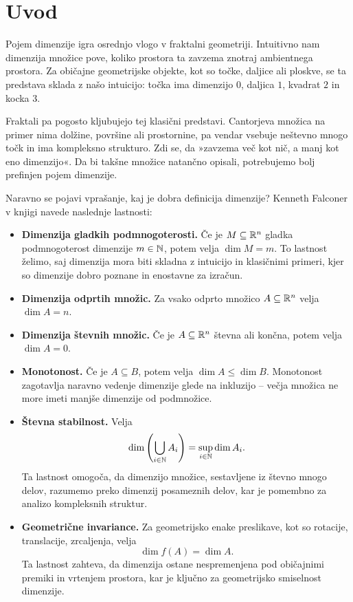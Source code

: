 \section{Uvod}
Pojem dimenzije igra osrednjo vlogo v fraktalni geometriji. Intuitivno nam dimenzija množice pove, koliko prostora ta zavzema znotraj ambientnega prostora. Za običajne geometrijske objekte, kot so točke, daljice ali ploskve, se ta predstava sklada z našo intuicijo: točka ima dimenzijo \(0\), daljica \(1\), kvadrat \(2\) in kocka \(3\).

Fraktali pa pogosto kljubujejo tej klasični predstavi. Cantorjeva množica na primer nima dolžine, površine ali prostornine, pa vendar vsebuje neštevno mnogo točk in ima kompleksno strukturo. Zdi se, da »zavzema več kot nič, a manj kot eno dimenzijo«. Da bi takšne množice natančno opisali, potrebujemo bolj prefinjen pojem dimenzije.

Naravno se pojavi vprašanje, kaj je dobra definicija dimenzije? Kenneth Falconer v knjigi \cite{fk-fg} navede naslednje lastnosti:

\begin{itemize}
    \item \textbf{Dimenzija gladkih podmnogoterosti.} Če je \(M \subseteq \mathbb{R}^n\) gladka podmnogoterost dimenzije \(m \in \mathbb{N}\), potem velja \(\dim M = m\).  
    To lastnost želimo, saj dimenzija mora biti skladna z intuicijo in klasičnimi primeri, kjer so dimenzije dobro poznane in enostavne za izračun.

    \item \textbf{Dimenzija odprtih množic.} Za vsako odprto množico \(A \subseteq \mathbb{R}^n\) velja \(\dim A = n\). 

    \item \textbf{Dimenzija števnih množic.} Če je \(A \subseteq \mathbb{R}^n\) števna ali končna, potem velja \(\dim A = 0\).  

    \item \textbf{Monotonost.} Če je \(A \subseteq B\), potem velja \(\dim A \leq \dim B\).  
    Monotonost zagotavlja naravno vedenje dimenzije glede na inkluzijo -- večja množica ne more imeti manjše dimenzije od podmnožice.

    \item \textbf{Števna stabilnost.} Velja 
    \[
        \dim \left(\bigcup_{i \in \mathbb{N}} A_i\right) = \sup_{i \in \mathbb{N}} \dim A_i.
    \]  
    Ta lastnost omogoča, da dimenzijo množice, sestavljene iz števno mnogo delov, razumemo preko dimenzij posameznih delov, kar je pomembno za analizo kompleksnih struktur.

    \item \textbf{Geometrične invariance.} Za geometrijsko enake preslikave, kot so rotacije, translacije, zrcaljenja, velja 
    \[
        \dim f(A) = \dim A.
    \]  
    Ta lastnost zahteva, da dimenzija ostane nespremenjena pod običajnimi premiki in vrtenjem prostora, kar je ključno za geometrijsko smiselnost dimenzije.
\end{itemize}

